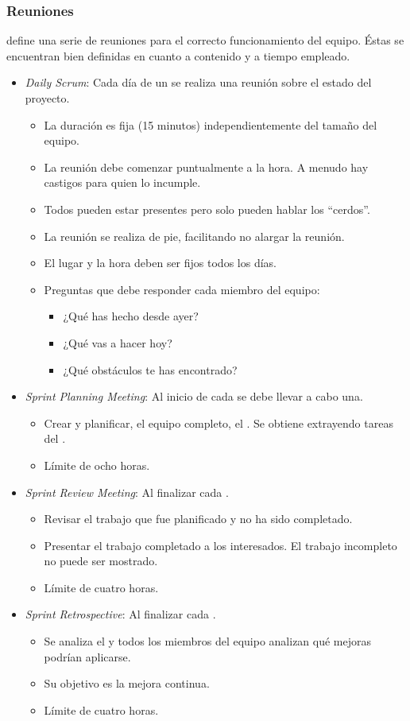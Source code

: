 \subsubsection*{Reuniones}
\scrum{} define una serie de reuniones para el correcto funcionamiento del equipo. Éstas se encuentran bien definidas en cuanto a contenido y a tiempo empleado.
\begin{itemize}
 \item \textit{Daily Scrum}: Cada día de un \sprint{} se realiza una reunión sobre el estado del proyecto.
  \begin{itemize}
   \item La duración es fija (15 minutos) independientemente del tamaño del equipo.
   \item La reunión debe comenzar puntualmente a la hora. A menudo hay castigos para quien lo incumple.
   \item Todos pueden estar presentes pero solo pueden hablar los ``cerdos''.
   \item La reunión se realiza de pie, facilitando no alargar la reunión.
   \item El lugar y la hora deben ser fijos todos los días.
   \item Preguntas que debe responder cada miembro del equipo:
    \begin{itemize}
     \item ¿Qué has hecho desde ayer?
     \item ¿Qué vas a hacer hoy?
     \item ¿Qué obstáculos te has encontrado?
    \end{itemize}
  \end{itemize}
 \item \textit{Sprint Planning Meeting}: Al inicio de cada \sprint{} se debe llevar a cabo una.
  \begin{itemize}
   \item Crear y planificar, el equipo completo, el \sprintbacklog{}. Se obtiene extrayendo tareas del \productbacklog{}.
   \item Límite de ocho horas.
  \end{itemize}
 \item \textit{Sprint Review Meeting}: Al finalizar cada \sprint{}.
  \begin{itemize}
   \item Revisar el trabajo que fue planificado y no ha sido completado.
   \item Presentar el trabajo completado a los interesados. El trabajo incompleto no puede ser mostrado.
   \item Límite de cuatro horas.
  \end{itemize}
 \item \textit{Sprint Retrospective}: Al finalizar cada \sprint{}.
  \begin{itemize}
   \item Se analiza el \sprint{} y todos los miembros del equipo analizan qué mejoras podrían aplicarse.
   \item Su objetivo es la mejora continua.
   \item Límite de cuatro horas.
  \end{itemize}
\end{itemize}


